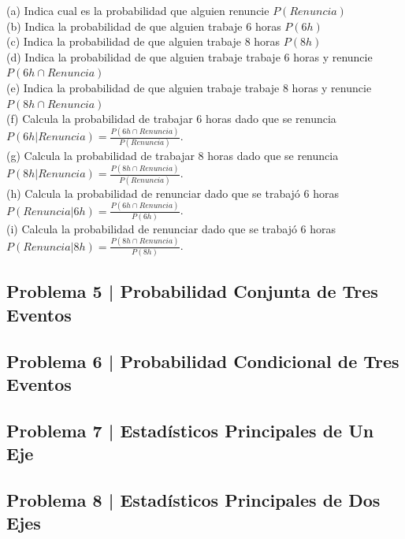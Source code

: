 \documentclass{article}
\begin{document}
\break
\noindent
(a) Indica cual es la probabilidad que alguien renuncie $P(Renuncia)$
\\[6pt]
(b) Indica la probabilidad de que alguien trabaje 6 horas $P(6h)$
\\[6pt]
(c) Indica la probabilidad de que alguien trabaje 8 horas $P(8h)$
\\[6pt]
(d) Indica la probabilidad de que alguien trabaje trabaje 6 horas y renuncie $P(6h \cap Renuncia)$
\\[6pt]
(e) Indica la probabilidad de que alguien trabaje trabaje 8 horas y renuncie $P(8h \cap Renuncia)$
\\[6pt]
(f) Calcula la probabilidad de trabajar 6 horas dado que se renuncia 
\\[6pt]
$P(6h|Renuncia) = \frac{P(6h \cap Renuncia)}{P(Renuncia)}$.
\\[6pt]
(g) Calcula la probabilidad de trabajar 8 horas dado que se renuncia
\\[6pt]
$P(8h|Renuncia) = \frac{P(8h \cap Renuncia)}{P(Renuncia)}$.
\\[6pt]
(h) Calcula la probabilidad de renunciar dado que se trabajó 6 horas 
\\[6pt]
$P(Renuncia|6h) = \frac{P(6h \cap Renuncia)}{P(6h)}$.
\\[6pt]
(i) Calcula la probabilidad de renunciar dado que se trabajó 6 horas 
\\[6pt]
$P(Renuncia|8h) = \frac{P(8h \cap Renuncia)}{P(8h)}$.

\clearpage

\subsection*{Problema 5 | Probabilidad Conjunta de Tres Eventos}

\subsection*{Problema 6 | Probabilidad Condicional de Tres Eventos}

\subsection*{Problema 7 | Estadísticos Principales de Un Eje}

\subsection*{Problema 8 | Estadísticos Principales de Dos Ejes }
\end{document}
